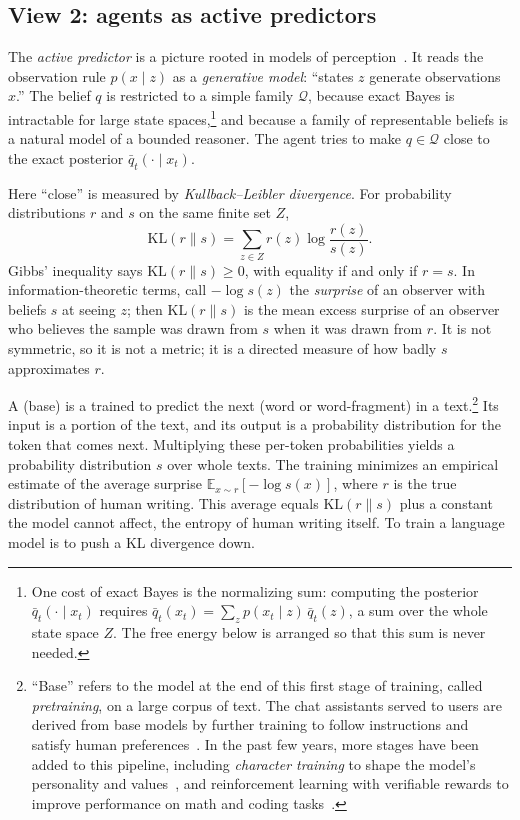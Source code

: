 \subsection{View 2: agents as active predictors}

The \emph{active predictor} is a picture rooted in models of perception~\cite{rao1999}. It reads the observation rule $p(x\mid z)$ as a \emph{generative model}: ``states $z$ generate observations $x$.'' The belief $q$ is restricted to a simple family $\mathcal Q$, because exact Bayes is intractable for large state spaces,\footnote{One cost of exact Bayes is the normalizing sum: computing the posterior $\bar q_t(\cdot\mid x_t)$ requires $\bar q_t(x_t)=\sum_z p(x_t\mid z)\,\bar q_t(z)$, a sum over the whole state space $Z$. The free energy below is arranged so that this sum is never needed.} and because a family of representable beliefs is a natural model of a bounded reasoner. The agent tries to make $q\in\mathcal Q$ close to the exact posterior $\bar q_t(\cdot\mid x_t)$.

Here ``close'' is measured by \emph{Kullback--Leibler divergence}. For probability distributions $r$ and $s$ on the same finite set $Z$,
\[
   \mathrm{KL}(r\|s)=\sum_{z \in Z} r(z)\log\frac{r(z)}{s(z)}.
\]
Gibbs' inequality says $\mathrm{KL}(r\|s)\ge0$, with equality if and only if $r=s$. In information-theoretic terms, call $-\log s(z)$ the \emph{surprise} of an observer with beliefs $s$ at seeing $z$; then $\mathrm{KL}(r\|s)$ is the mean excess surprise of an observer who believes the sample was drawn from $s$ when it was drawn from $r$. It is not symmetric, so it is not a metric; it is a directed measure of how badly $s$ approximates $r$.

A (base)  is a  trained to predict the next  (word or word-fragment) in a text.\footnote{``Base'' refers to the model at the end of this first stage of training, called \emph{pretraining}, on a large corpus of text. The chat assistants served to users are derived from base models by further training to follow instructions and satisfy human preferences~\cite{ouyang2022}. In the past few years, more stages have been added to this pipeline, including \emph{character training} to shape the model's personality and values~\cite{maiya2025}, and reinforcement learning with verifiable rewards to improve performance on math and coding tasks~\cite{lambert2024}.} Its input is a portion of the text, and its output is a probability distribution for the token that comes next. Multiplying these per-token probabilities yields a probability distribution $s$ over whole texts. The training minimizes an empirical estimate of the average surprise $\mathbb{E}_{x\sim r}[-\log s(x)]$, where $r$ is the true distribution of human writing. This average equals $\mathrm{KL}(r\|s)$ plus a constant the model cannot affect, the entropy of human writing itself. To train a language model is to push a KL divergence down.

